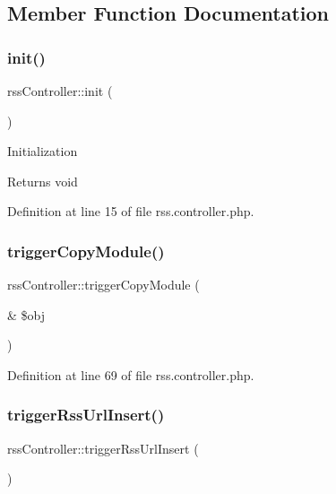 \subsection{Member Function Documentation}
\hypertarget{classrssController_ab492c2ecc29016a37dcb049f318a176b}{}\label{classrssController_ab492c2ecc29016a37dcb049f318a176b} 
\subsubsection{\texorpdfstring{init()}{init()}}
{\footnotesize\ttfamily rss\+Controller\+::init (\begin{DoxyParamCaption}{ }\end{DoxyParamCaption})}

Initialization

\begin{DoxyReturn}{Returns}
void 
\end{DoxyReturn}


Definition at line 15 of file rss.\+controller.\+php.

\hypertarget{classrssController_a4c6d4fe22c2f2abeabe6a1231a63fa8b}{}\label{classrssController_a4c6d4fe22c2f2abeabe6a1231a63fa8b} 
\subsubsection{\texorpdfstring{trigger\+Copy\+Module()}{triggerCopyModule()}}
{\footnotesize\ttfamily rss\+Controller\+::trigger\+Copy\+Module (\begin{DoxyParamCaption}\item[{\&}]{\$obj }\end{DoxyParamCaption})}



Definition at line 69 of file rss.\+controller.\+php.

\hypertarget{classrssController_a95c7672a5f1e362b368bec030577f33e}{}\label{classrssController_a95c7672a5f1e362b368bec030577f33e} 
\subsubsection{\texorpdfstring{trigger\+Rss\+Url\+Insert()}{triggerRssUrlInsert()}}
{\footnotesize\ttfamily rss\+Controller\+::trigger\+Rss\+Url\+Insert (\begin{DoxyParamCaption}{ }\end{DoxyParamCaption})}

